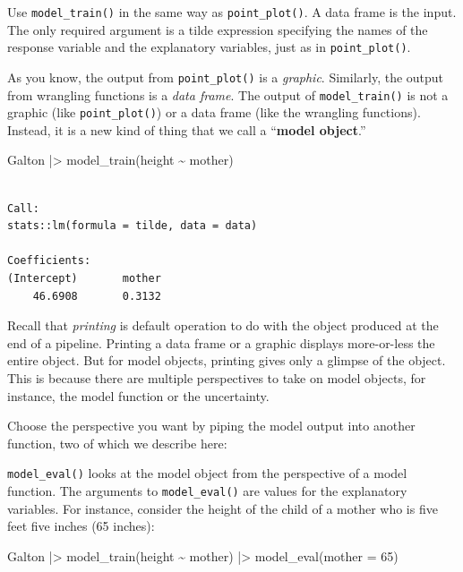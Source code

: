 \documentclass[
  letterpaper,
  DIV=11,
  numbers=noendperiod,
  oneside]{scrartcl}
\newenvironment{Shaded}{\begin{snugshade}}{\end{snugshade}}
\newcommand{\AttributeTok}[1]{\textcolor[rgb]{0.40,0.45,0.13}{#1}}
\newcommand{\DecValTok}[1]{\textcolor[rgb]{0.68,0.00,0.00}{#1}}
\newcommand{\FunctionTok}[1]{\textcolor[rgb]{0.28,0.35,0.67}{#1}}
\newcommand{\NormalTok}[1]{\textcolor[rgb]{0.00,0.23,0.31}{#1}}
\newcommand{\SpecialCharTok}[1]{\textcolor[rgb]{0.37,0.37,0.37}{#1}}
\begin{document}
Use \texttt{model\_train()} in the same way as \texttt{point\_plot()}. A
data frame is the input. The only required argument is a tilde
expression specifying the names of the response variable and the
explanatory variables, just as in \texttt{point\_plot()}.

As you know, the output from \texttt{point\_plot()} is a \emph{graphic}.
Similarly, the output from wrangling functions is a \emph{data frame}.
The output of \texttt{model\_train()} is not a graphic (like
\texttt{point\_plot()}) or a data frame (like the wrangling functions).
Instead, it is a new kind of thing that we call a ``\textbf{model
object}.''

\begin{Shaded}
\begin{Highlighting}[]
\NormalTok{Galton }\SpecialCharTok{|\textgreater{}} \FunctionTok{model\_train}\NormalTok{(height }\SpecialCharTok{\textasciitilde{}}\NormalTok{ mother)}
\end{Highlighting}
\end{Shaded}

\begin{verbatim}

Call:
stats::lm(formula = tilde, data = data)

Coefficients:
(Intercept)       mother  
    46.6908       0.3132  
\end{verbatim}

Recall that \emph{printing} is default operation to do with the object
produced at the end of a pipeline. Printing a data frame or a graphic
displays more-or-less the entire object. But for model objects, printing
gives only a glimpse of the object. This is because there are multiple
perspectives to take on model objects, for instance, the model function
or the uncertainty.

Choose the perspective you want by piping the model output into another
function, two of which we describe here:

\texttt{model\_eval()} looks at the model object from the perspective of
a model function. The arguments to \texttt{model\_eval()} are values for
the explanatory variables. For instance, consider the height of the
child of a mother who is five feet five inches (65 inches):

\begin{Shaded}
\begin{Highlighting}[]
\NormalTok{Galton }\SpecialCharTok{|\textgreater{}} \FunctionTok{model\_train}\NormalTok{(height }\SpecialCharTok{\textasciitilde{}}\NormalTok{ mother) }\SpecialCharTok{|\textgreater{}} \FunctionTok{model\_eval}\NormalTok{(}\AttributeTok{mother =} \DecValTok{65}\NormalTok{)}
\end{Highlighting}
\end{Shaded}
\end{document}
